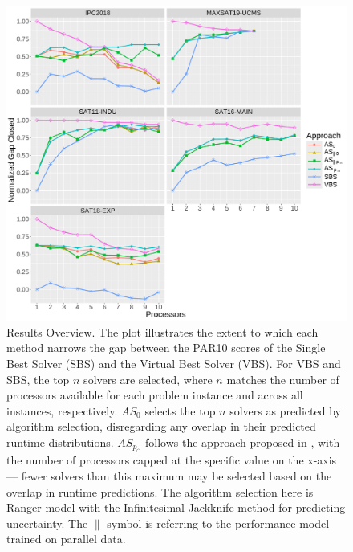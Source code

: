 \begin{figure}[ht]
        \includegraphics[width=\linewidth]{plots/pl_pcap_comparison_line_chart_parallel_NormalizedGap.pdf}    
    \caption[Results Summary: Comparing $AS_{p_{\cap}}$ with $AS_{\parallel p_{\cap}}$ Performance]{
    Results Overview. The plot illustrates the extent to which each method narrows the gap between the PAR10 scores of the Single Best Solver (SBS) and the Virtual Best Solver (VBS). For VBS and SBS, the top $n$ solvers are selected, where $n$ matches the number of processors available for each problem instance and across all instances, respectively. $AS_0$ selects the top $n$ solvers as predicted by algorithm selection, disregarding any overlap in their predicted runtime distributions. $AS_{p_{\cap}}$ follows the approach proposed in \cite{kashgarani2023automatic}, with the number of processors capped at the specific value on the x-axis — fewer solvers than this maximum may be selected based on the overlap in runtime predictions. The algorithm selection here is Ranger model with the Infinitesimal Jackknife method for predicting uncertainty. The $\parallel$ symbol is referring to the performance model trained on parallel data.
    }
    \label{fig:parallelvssequential}
\end{figure}



